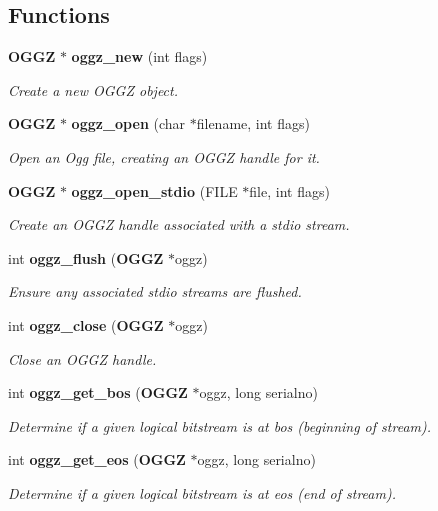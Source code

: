 \subsection*{Functions}
\begin{CompactItemize}
\item 
{\bf OGGZ} $\ast$ {\bf oggz\_\-new} (int flags)
\begin{CompactList}\small\item\em Create a new OGGZ object. \item\end{CompactList}\item 
{\bf OGGZ} $\ast$ {\bf oggz\_\-open} (char $\ast$filename, int flags)
\begin{CompactList}\small\item\em Open an Ogg file, creating an OGGZ handle for it. \item\end{CompactList}\item 
{\bf OGGZ} $\ast$ {\bf oggz\_\-open\_\-stdio} (FILE $\ast$file, int flags)
\begin{CompactList}\small\item\em Create an OGGZ handle associated with a stdio stream. \item\end{CompactList}\item 
int {\bf oggz\_\-flush} ({\bf OGGZ} $\ast$oggz)
\begin{CompactList}\small\item\em Ensure any associated stdio streams are flushed. \item\end{CompactList}\item 
int {\bf oggz\_\-close} ({\bf OGGZ} $\ast$oggz)
\begin{CompactList}\small\item\em Close an OGGZ handle. \item\end{CompactList}\item 
int {\bf oggz\_\-get\_\-bos} ({\bf OGGZ} $\ast$oggz, long serialno)
\begin{CompactList}\small\item\em Determine if a given logical bitstream is at bos (beginning of stream). \item\end{CompactList}\item 
int {\bf oggz\_\-get\_\-eos} ({\bf OGGZ} $\ast$oggz, long serialno)
\begin{CompactList}\small\item\em Determine if a given logical bitstream is at eos (end of stream). \item\end{CompactList}\item 

\end{CompactItemize}

